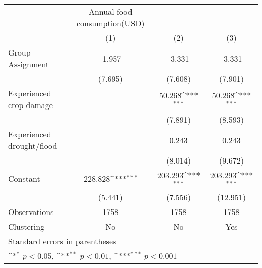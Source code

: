 {
\def\sym#1{\ifmmode^{#1}\else\(^{#1}\)\fi}
\begin{tabular}{l*{3}{c}}
\hline\hline
                    &Annual food consumption(USD)                                     \\
                    &\multicolumn{1}{c}{(1)}         &\multicolumn{1}{c}{(2)}         &\multicolumn{1}{c}{(3)}         \\
\hline
Group Assignment    &      -1.957         &      -3.331         &      -3.331         \\
                    &     (7.695)         &     (7.608)         &     (7.901)         \\
[1em]
Experienced crop damage&                     &      50.268\sym{***}&      50.268\sym{***}\\
                    &                     &     (7.891)         &     (8.593)         \\
[1em]
Experienced drought/flood&                     &       0.243         &       0.243         \\
                    &                     &     (8.014)         &     (9.672)         \\
[1em]
Constant            &     228.828\sym{***}&     203.293\sym{***}&     203.293\sym{***}\\
                    &     (5.441)         &     (7.556)         &    (12.951)         \\
\hline
Observations        &        1758         &        1758         &        1758         \\
Clustering          &          No         &          No         &         Yes         \\
\hline\hline
\multicolumn{4}{l}{\footnotesize Standard errors in parentheses}\\
\multicolumn{4}{l}{\footnotesize \sym{*} \(p<0.05\), \sym{**} \(p<0.01\), \sym{***} \(p<0.001\)}\\
\end{tabular}
}
